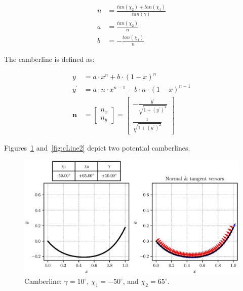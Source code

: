 \begin{align}
  n & = \frac{tan(\chi_2) + tan(\chi_1)}{tan(\gamma)} \\
  a & = \frac{tan(\chi_2)}{n} \\
  b & = - \frac{tan(\chi_1)}{n}
\end{align}

The camberline is defined as:

\begin{align}
  y          & = a \cdot x^n + b \cdot (1 - x)^n \\
  y^{\prime} & = a \cdot n \cdot x^{n-1} - b \cdot n \cdot (1 - x)^{n - 1} \\
  \boldsymbol{n} & = 
  \begin{bmatrix}
    n_x \\
    n_y
  \end{bmatrix} =
  \begin{bmatrix}
    - \frac{y^{\prime}}{\sqrt{1 + (y^{\prime})^2}} \\
    \frac{1}{\sqrt{1 + (y^{\prime})^2}}
  \end{bmatrix}
\end{align}

Figures~\ref{fig:cLine1} and~\ref{fig:cLine2} depict two potential camberlines.

\begin{figure}[!h]
  \centering
  \includegraphics[width=1\linewidth, trim=0cm 1.5cm 0cm 1cm, clip]{pyFigure/figures/cLine1.eps}
  \caption{Camberline: $\gamma = 10^{\circ}$, $\chi_1 = -50^{\circ}$, and $\chi_2 = 65^{\circ}$.}
  \label{fig:cLine1}
\end{figure}

